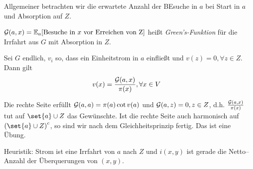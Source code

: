 Allgemeiner betrachten wir die erwartete Anzahl der BEsuche in $a$ bei Start in $a$ und Absorption auf $Z$.
\begin{definition}
	$\mathcal{G}(a,x) = \EW{\relax}_a \benb{\text{Besuche in $x$ vor Erreichen von Z}}$ heißt \emph{Green's-Funktion} für die Irrfahrt aus $G$ mit Absorption in $Z$.
\end{definition}

\begin{satz}
	Sei $G$ endlich, $v_i$ so, dass ein Einheitstrom in $a$ einfließt und $v(z) = 0, \forall z \in Z$. Dann gilt
	\begin{align}
		v(x) = \frac{\greens{a,x}}{\pi(x)}, \forall x \in V
	\end{align}
\end{satz}
\begin{beweis}
	Die rechte Seite erfüllt $\greens{a,a} = \pi(a) \cot v(a)$ und $\greens{a,z} = 0, z \in Z$, d.h. $\frac{\mathcal{G}\left(a,x\right)}{\pi(x)}$ tut auf $\set{a} \cup Z$ das Gewünschte. Ist die rechte Seite auch harmonisch auf  $\enb{\set{a} \cup Z}^c$, so sind wir nach dem Gleichheitsprinzip fertig. Das ist eine Übung.
\end{beweis}
Heuristik: Strom ist eine Irrfahrt von $a$ nach $Z$ und $i(x,y)$ ist gerade die Netto--Anzahl der Überquerungen von $(x,y)$.


